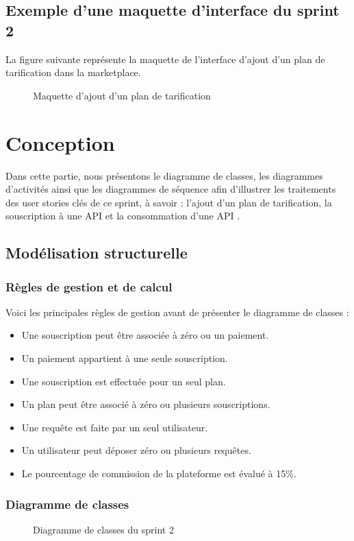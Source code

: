 \subsection{Exemple d'une maquette d'interface du sprint 2 }
La figure suivante représente la maquette de l'interface d'ajout d'un plan de tarification dans la marketplace.
\begin{figure}[H]
    \centering
    \caption{Maquette d'ajout d'un plan de tarification}
    \label{fig:logo_tt}
\end{figure}
\pagebreak

\section{Conception}
Dans cette partie, nous présentons le diagramme de classes, les diagrammes d'activités ainsi que les diagrammes de séquence afin d'illustrer les traitements des user stories clés de ce sprint, à savoir : l'ajout d'un plan de tarification, la souscription à une API et la consommation d'une API .
\subsection{Modélisation structurelle}

\subsubsection{Règles de gestion et de calcul}
Voici les principales règles de gestion avant de présenter le diagramme de classes :
\begin{itemize}
    \item  Une souscription peut être associée à zéro ou un paiement.
    \item Un paiement appartient à une seule souscription.
    \item Une souscription est effectuée pour un seul plan.
    \item Un plan peut être associé à zéro ou plusieurs souscriptions.
    \item Une requête est faite par un seul utilisateur.
    \item Un utilisateur peut déposer zéro ou plusieurs requêtes.
    \item Le pourcentage de commission de la plateforme est évalué à 15\%.
\end{itemize}

\subsubsection{Diagramme de classes}
\begin{figure}[H]
    \centering
    \caption{Diagramme de classes du sprint 2}
    \label{fig:logo_tt}
\end{figure}
\pagebreak

